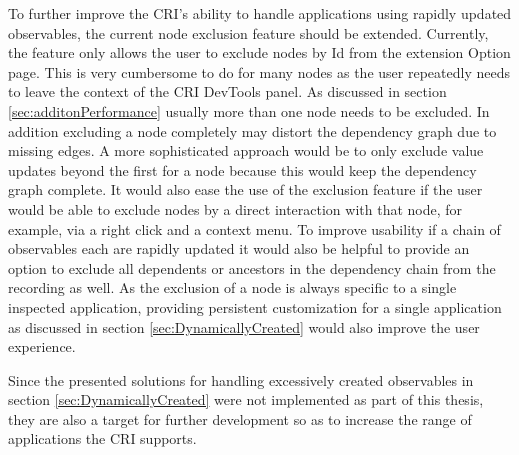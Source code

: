 To further improve the CRI's ability to handle applications using rapidly updated observables, the current node exclusion feature should be extended. Currently, the feature only allows the user to exclude nodes by Id from the extension Option page. This is very cumbersome to do for many nodes as the user repeatedly needs to leave the context of the CRI DevTools panel. As discussed in section \ref{sec:additonPerformance} usually more than one node needs to be excluded. In addition excluding a node completely may distort the dependency graph due to missing edges. A more sophisticated approach would be to only exclude value updates beyond the first for a node because this would keep the dependency graph complete. It would also ease the use of the exclusion feature if the user would be able to exclude nodes by a direct interaction with that node, for example, via a right click and a context menu. To improve usability if a chain of observables each are rapidly updated it would also be helpful to provide an option to exclude all dependents or ancestors in the dependency chain from the recording as well.
As the exclusion of a node is always specific to a single inspected application, providing persistent customization for a single application as discussed in section \ref{sec:DynamicallyCreated} would also improve the user experience.

Since the presented solutions for handling excessively created observables in section \ref{sec:DynamicallyCreated} were not implemented as part of this thesis, they are also a target for further development so as to increase the range of applications the CRI supports.
 	
